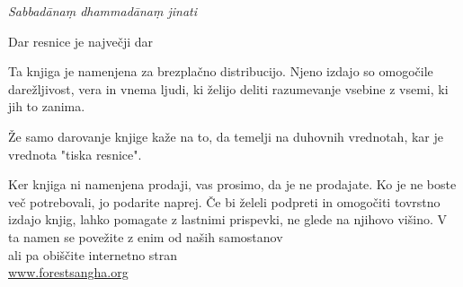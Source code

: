 
\begin{quotepage}{0.9\linewidth}
\smaller\centering\setlength{\parskip}{1em}

\textit{Sabbad\=ana\d{m} dhammad\=ana\d{m} jinati}\\
\vspace*{0.25\baselineskip}

Dar resnice je največji dar
\bigskip

\label{dont-sell}
Ta knjiga je namenjena za brezplačno distribucijo. Njeno izdajo so omogočile darežljivost, vera in vnema ljudi, ki želijo deliti razumevanje vsebine z vsemi, ki jih to zanima.

Že samo darovanje knjige kaže na to, da temelji na duhovnih vrednotah, kar je vrednota "tiska resnice".

Ker knjiga ni namenjena prodaji, vas prosimo, da je ne prodajate. Ko je ne boste več potrebovali, jo podarite naprej. Če bi želeli podpreti in omogočiti tovrstno izdajo knjig, lahko pomagate z lastnimi prispevki, ne glede na njihovo višino. V ta namen se povežite z enim od naših samostanov\\
ali pa obiščite internetno stran\\
\href{http://forestsangha.org}{www.forestsangha.org}

\end{quotepage}

